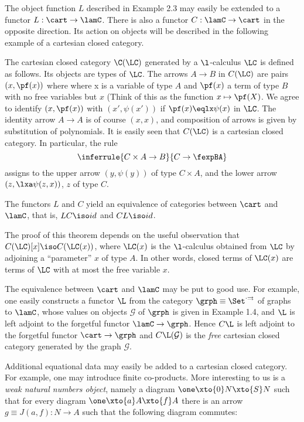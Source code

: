 The object function $L$ described in Example 2.3 may easily be extended
to a functor $L: \cart \to \lamC$. There is also a functor $C: \lamC \to \cart$ in
the opposite direction. Its action on objects will be described in the
following example of a cartesian closed category.

\begin{example}
The cartesian closed category $\C(\LC)$ generated by a
$\l$-calculus $\LC$ is defined as follows.
Its objects are types of $\LC$. The arrows $A \to B$ in $C(\LC)$ are
pairs $(x, \pf(x))$ where where x is a variable of type $A$ and $\pf(x)$ a term
of type $B$ with no free variables but $x$ (Think of this as the
function $x \mapsto \pf(X)$. We agree to identify $(x,\pf(x))$ with $(x', \psi(x'))$
if $\pf(x) \eqlx \psi(x)$ in $\LC$. The identity arrow $A \to A$ is of course $(x,x)$,
and composition of arrows is given by substitution of polynomials. It is easily
seen that $C(\LC)$ is a cartesian closed category. In particular, the rule
\[
\inferrule{C \times A \to B}{C \to \fexpBA}
\]
assigns to the upper arrow $(y,\psi(y))$ of type $C \times A$, and the lower arrow
$(z, \lxa \psi(z,x))$, $z$ of type $C$.
\end{example}

\begin{thm}
The functors $L$ and $C$ yield an equivalence of categories
between $\cart$ and $\lamC$, that is, $LC \iso id$ and $CL \iso id$.
\end{thm}

The proof of this theorem depends on the useful observation that
$C(\LC)[x] \iso C(\LC(x))$, where $\LC(x)$ is the $\l$-calculus
obtained from $\LC$ by adjoining a ``parameter'' $x$ of type $A$.
In other words, closed terms of
$\LC(x)$ are terms of $\LC$ with at most the free variable $x$.

The equivalence between $\cart$ and $\lamC$ may be put to good use. For
example, one easily constructs a functor $\L$ from the category
$\grph \equiv \Set^{\cdot\rightrightarrows}$
of graphs to $\lamC$, whose values on objects $\mathcal G$ of $\grph$
is given in Example 1.4, and $\L$ is left adjoint to the forgetful functor
$\lamC \to \grph$. Hence $C\L$ is left adjoint to the forgetful functor
$\cart \to \grph$ and $C\L(\mathcal G)$ is the {\em free} 
cartesian closed category generated by the graph $\mathcal G$.

Additional equational data may easily be added to a cartesian closed
category. For example, one may introduce finite co-products. More interesting
to us is a {\em weak natural numbers object}, namely a diagram 
$\one \xto{0} N \xto{S} N$ such that for every diagram
$\one \xto{a} A \xto{f} A$ there is an arrow $g \equiv J(a,f) : N \to A$ such that
the following diagram commutes:

